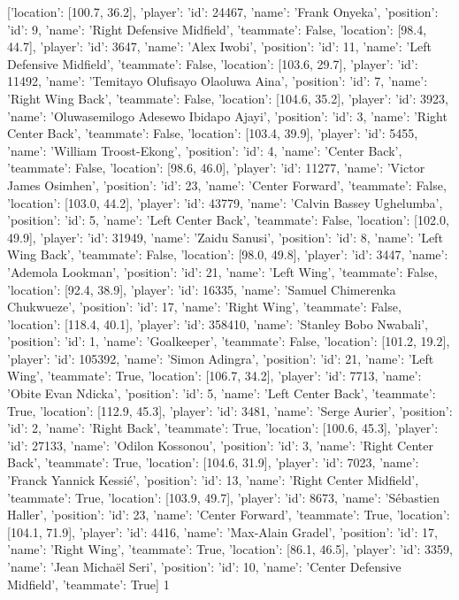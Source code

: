 [{'location': [100.7, 36.2], 'player': {'id': 24467, 'name': 'Frank Onyeka'}, 'position': {'id': 9, 'name': 'Right Defensive Midfield'}, 'teammate': False}, {'location': [98.4, 44.7], 'player': {'id': 3647, 'name': 'Alex Iwobi'}, 'position': {'id': 11, 'name': 'Left Defensive Midfield'}, 'teammate': False}, {'location': [103.6, 29.7], 'player': {'id': 11492, 'name': 'Temitayo Olufisayo Olaoluwa Aina'}, 'position': {'id': 7, 'name': 'Right Wing Back'}, 'teammate': False}, {'location': [104.6, 35.2], 'player': {'id': 3923, 'name': 'Oluwasemilogo Adesewo Ibidapo Ajayi'}, 'position': {'id': 3, 'name': 'Right Center Back'}, 'teammate': False}, {'location': [103.4, 39.9], 'player': {'id': 5455, 'name': 'William Troost-Ekong'}, 'position': {'id': 4, 'name': 'Center Back'}, 'teammate': False}, {'location': [98.6, 46.0], 'player': {'id': 11277, 'name': 'Victor James Osimhen'}, 'position': {'id': 23, 'name': 'Center Forward'}, 'teammate': False}, {'location': [103.0, 44.2], 'player': {'id': 43779, 'name': 'Calvin Bassey Ughelumba'}, 'position': {'id': 5, 'name': 'Left Center Back'}, 'teammate': False}, {'location': [102.0, 49.9], 'player': {'id': 31949, 'name': 'Zaidu Sanusi'}, 'position': {'id': 8, 'name': 'Left Wing Back'}, 'teammate': False}, {'location': [98.0, 49.8], 'player': {'id': 3447, 'name': 'Ademola Lookman'}, 'position': {'id': 21, 'name': 'Left Wing'}, 'teammate': False}, {'location': [92.4, 38.9], 'player': {'id': 16335, 'name': 'Samuel Chimerenka Chukwueze'}, 'position': {'id': 17, 'name': 'Right Wing'}, 'teammate': False}, {'location': [118.4, 40.1], 'player': {'id': 358410, 'name': 'Stanley Bobo Nwabali'}, 'position': {'id': 1, 'name': 'Goalkeeper'}, 'teammate': False}, {'location': [101.2, 19.2], 'player': {'id': 105392, 'name': 'Simon Adingra'}, 'position': {'id': 21, 'name': 'Left Wing'}, 'teammate': True}, {'location': [106.7, 34.2], 'player': {'id': 7713, 'name': 'Obite Evan Ndicka'}, 'position': {'id': 5, 'name': 'Left Center Back'}, 'teammate': True}, {'location': [112.9, 45.3], 'player': {'id': 3481, 'name': 'Serge Aurier'}, 'position': {'id': 2, 'name': 'Right Back'}, 'teammate': True}, {'location': [100.6, 45.3], 'player': {'id': 27133, 'name': 'Odilon Kossonou'}, 'position': {'id': 3, 'name': 'Right Center Back'}, 'teammate': True}, {'location': [104.6, 31.9], 'player': {'id': 7023, 'name': 'Franck Yannick Kessié'}, 'position': {'id': 13, 'name': 'Right Center Midfield'}, 'teammate': True}, {'location': [103.9, 49.7], 'player': {'id': 8673, 'name': 'Sébastien Haller'}, 'position': {'id': 23, 'name': 'Center Forward'}, 'teammate': True}, {'location': [104.1, 71.9], 'player': {'id': 4416, 'name': 'Max-Alain Gradel'}, 'position': {'id': 17, 'name': 'Right Wing'}, 'teammate': True}, {'location': [86.1, 46.5], 'player': {'id': 3359, 'name': 'Jean Michaël Seri'}, 'position': {'id': 10, 'name': 'Center Defensive Midfield'}, 'teammate': True}]          1
